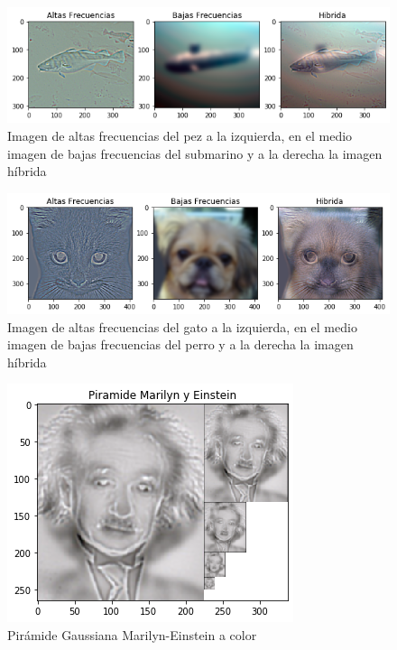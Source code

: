 \documentclass[12pt,spanish]{article}
\begin{document}
\begin{figure}[H]
	\includegraphics[width=\textwidth]{./imagenes_memoria/b2c1}
	\caption{Imagen de altas frecuencias del pez a la izquierda, en el medio imagen de bajas frecuencias del submarino y a la derecha la imagen híbrida}
	\label{bonus2c1}
\end{figure}

\begin{figure}[H]
	\includegraphics[width=\textwidth]{./imagenes_memoria/b2d1}
	\caption{Imagen de altas frecuencias del gato a la izquierda, en el medio imagen de bajas frecuencias del perro y a la derecha la imagen híbrida}
	\label{bonus2d1}
\end{figure}

\begin{figure}[H]
	\centering
	\includegraphics[scale=1.1]{./imagenes_memoria/b2a2}
	\caption{Pirámide Gaussiana Marilyn-Einstein a color}
	\label{bonus2a}
\end{figure}
\end{document}
